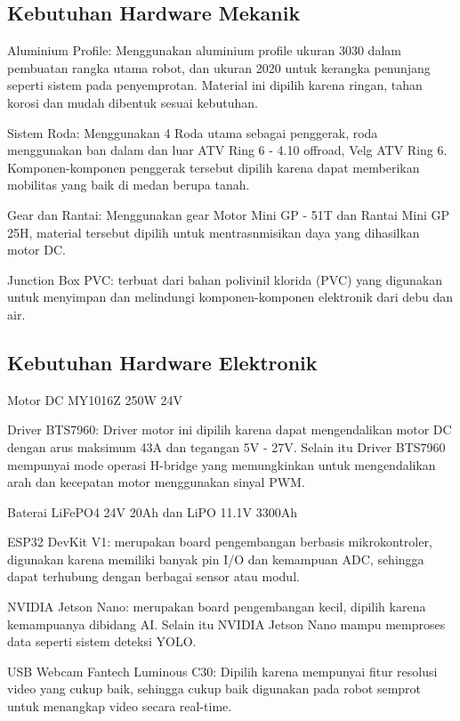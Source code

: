 \subsection{Kebutuhan Hardware Mekanik}
\begin{packed_item}
	\item Aluminium Profile: Menggunakan aluminium profile ukuran 3030 dalam pembuatan rangka utama robot, dan ukuran 2020 untuk kerangka penunjang seperti sistem pada penyemprotan. Material ini dipilih karena ringan, tahan korosi dan mudah dibentuk sesuai kebutuhan.  
	\item Sistem Roda: Menggunakan 4 Roda utama sebagai penggerak, roda menggunakan ban dalam dan luar ATV Ring 6 - 4.10 offroad, Velg ATV Ring 6. Komponen-komponen penggerak tersebut dipilih karena dapat memberikan mobilitas yang baik di medan berupa tanah.
	\item Gear dan Rantai: Menggunakan gear Motor Mini GP - 51T dan Rantai Mini GP 25H, material tersebut dipilih untuk mentrasnmisikan daya yang dihasilkan motor DC.
	\item Junction Box PVC:  terbuat dari bahan polivinil klorida (PVC) yang digunakan untuk menyimpan dan melindungi  komponen-komponen elektronik dari debu dan air.
\end{packed_item}

\subsection{Kebutuhan Hardware Elektronik}
\begin{packed_item}
	\item Motor DC  MY1016Z 250W 24V
	\item Driver BTS7960: Driver motor ini dipilih karena dapat mengendalikan motor DC dengan arus maksimum 43A dan tegangan 5V - 27V. Selain itu  Driver BTS7960 mempunyai mode operasi H-bridge yang memungkinkan untuk mengendalikan arah dan kecepatan motor menggunakan sinyal PWM. 
	\item Baterai LiFePO4 24V 20Ah dan LiPO 11.1V 3300Ah
	\item ESP32 DevKit V1: merupakan board pengembangan berbasis mikrokontroler, digunakan karena memiliki banyak pin I/O dan kemampuan ADC, sehingga dapat terhubung dengan berbagai sensor atau modul. 
	\item NVIDIA Jetson Nano: merupakan board pengembangan kecil, dipilih karena kemampuanya dibidang AI. Selain itu NVIDIA Jetson Nano mampu memproses data seperti sistem deteksi YOLO.
	\item  USB Webcam Fantech Luminous C30: Dipilih karena mempunyai fitur resolusi video yang cukup baik, sehingga cukup baik  digunakan pada robot semprot untuk menangkap video secara real-time.
\end{packed_item}

